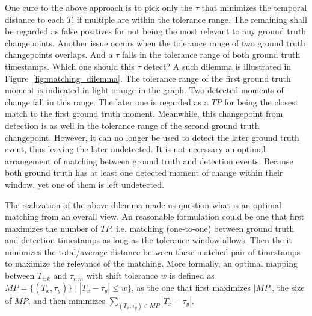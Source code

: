 One cure to the above approach is to pick only the $\tau$ that minimizes the temporal distance to each $T$, if multiple are within the tolerance range.
The remaining shall be regarded as false positives for not being the most relevant to any ground truth changepoints.
Another issue occurs when the tolerance range of two ground truth changepoints overlaps.
And a $\tau$ falls in the tolerance range of both ground truth timestamps.
Which one should this $\tau$ detect?
A such dilemma is illustrated in Figure~\ref{fig:matching_dilemma}.
The tolerance range of the first ground truth moment is indicated in light orange in the graph.
Two detected moments of change fall in this range.
The later one is regarded as a $TP$ for being the closest match to the first ground truth moment.
Meanwhile, this changepoint from detection is as well in the tolerance range of the second ground truth changepoint.
However, it can no longer be used to detect the later ground truth event, thus leaving the later undetected.
It is not necessary an optimal arrangement of matching between ground truth and detection events.
Because both ground truth has at least one detected moment of change within their window, yet one of them is left undetected.

The realization of the above dilemma made us question what is an optimal matching from an overall view.
An reasonable formulation could be one that first maximizes the number of $TP$, i.e. matching (one-to-one) between ground truth and detection timestamps as long as the tolerance window allows.
Then the it minimizes the total/average distance between these matched pair of timestamps to maximize the relevance of the matching.
More formally, an optimal mapping between $T_{i:k}$ and $\tau_{i:m}$ with shift tolerance $w$ is defined as $MP = \{(T_x, \tau_y)\} \mid |T_x - \tau_y| \leq w \}$, as the one that first maximizes $|MP|$, the size of $MP$, and then minimizes $\sum_{(T_x, \tau_y) \in MP} |T_x - \tau_y|$. 



